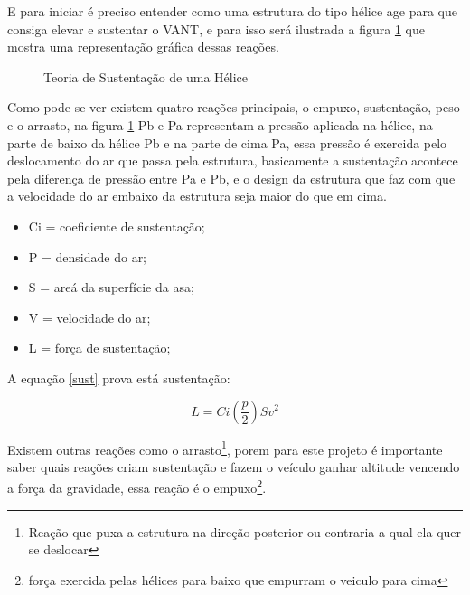 E para iniciar é preciso entender como uma estrutura do tipo hélice age para que consiga elevar e sustentar o VANT, e para isso será ilustrada a figura \ref{fig:asa} que mostra uma representação gráfica dessas reações. 

\begin{figure}[H]
	\centering
	\caption{Teoria de Sustentação de uma Hélice}
	\fontsize{9pt}{12pt}\selectfont
	\def\svgwidth{13cm}
	
	\label{fig:asa}
\end{figure}

Como pode se ver existem quatro reações principais, o empuxo, sustentação, peso e o arrasto, na figura \ref{fig:asa} Pb e Pa representam a pressão aplicada na hélice, na  parte de baixo da hélice Pb e na parte de cima Pa, essa pressão é exercida pelo deslocamento do ar que passa pela estrutura, basicamente a sustentação acontece pela diferença de pressão entre Pa e Pb, e o design da estrutura que faz com que a velocidade do ar embaixo da estrutura seja maior do que em cima.

\begin{itemize}
    \item Ci = coeficiente de sustentação;
    \item P = densidade do ar; 
    \item S = areá da superfície da asa;
    \item V = velocidade do ar; 
    \item L = força de sustentação;
\end{itemize}{}
A equação \ref{sust} prova está sustentação: 

\begin{equation}
    \label{sust}
    L=Ci\left(\frac{p}{2}\right)Sv^2
\end{equation}

Existem outras reações como o arrasto\footnote{Reação que puxa a estrutura na direção posterior ou contraria a qual ela quer se deslocar}, porem para este projeto é importante saber quais reações criam sustentação e fazem o veículo ganhar altitude vencendo a força da gravidade, essa reação é o empuxo\footnote{força exercida pelas hélices para baixo que empurram o veiculo para cima}\cite{inproceedings}.

